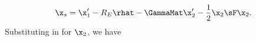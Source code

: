 \begin{equation}
\x_s = \x'_1 - R_E\rhat -  \GammaMat\x'_2 - \frac{1}{2}\x_2 \sF \x_2.
\label{eq:backgroundorder3}
\end{equation}
Substituting in for $\x_2$, we have
  
  
  
  